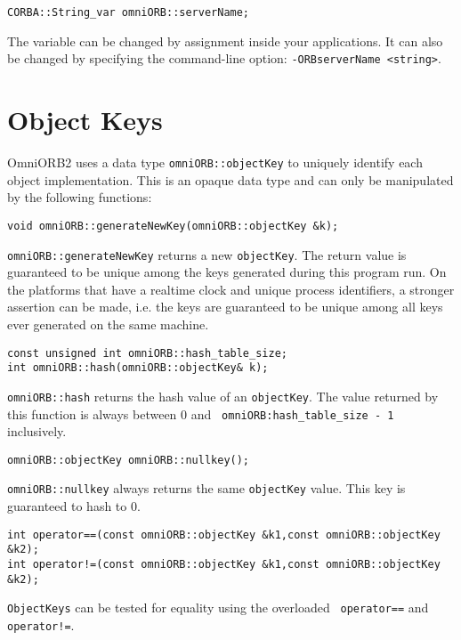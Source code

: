\documentclass[11pt,twoside,onecolumn]{book}
\begin{document}
{\small
\begin{verbatim}
CORBA::String_var omniORB::serverName;
\end{verbatim}
}

The variable can be changed by assignment inside your applications. It can
also be changed by specifying the command-line option: {\tt -ORBserverName
<string>}.
 
\section{Object Keys}

OmniORB2 uses a data type {\tt omniORB::objectKey} to uniquely
identify each object implementation. This is an opaque data type and 
can only be manipulated by the following functions:

{\small
\begin{verbatim}
void omniORB::generateNewKey(omniORB::objectKey &k);
\end{verbatim}
}

{\tt omniORB::generateNewKey} returns a new {\tt objectKey}. The return
value is guaranteed to be unique among the keys generated during this program
run. On the platforms that have a realtime clock and unique process
identifiers, a stronger assertion can be made, i.e. the keys are guaranteed
to be unique among all keys ever generated on the same machine.

{\small
\begin{verbatim}
const unsigned int omniORB::hash_table_size;
int omniORB::hash(omniORB::objectKey& k);
\end{verbatim}
}

{\tt omniORB::hash} returns the hash value of an {\tt objectKey}. The value
returned by this function is always between 0 and {\tt
omniORB:hash\_table\_size - 1} inclusively.

{\small
\begin{verbatim}
omniORB::objectKey omniORB::nullkey();
\end{verbatim}
}

{\tt omniORB::nullkey} always returns the same {\tt objectKey} value. This
key is guaranteed to hash to 0.

{\small
\begin{verbatim}
int operator==(const omniORB::objectKey &k1,const omniORB::objectKey &k2);
int operator!=(const omniORB::objectKey &k1,const omniORB::objectKey &k2);
\end{verbatim}
}

{\tt ObjectKeys} can be tested for equality using the overloaded {\tt
operator==} and {\tt operator!=}.
\end{document}
